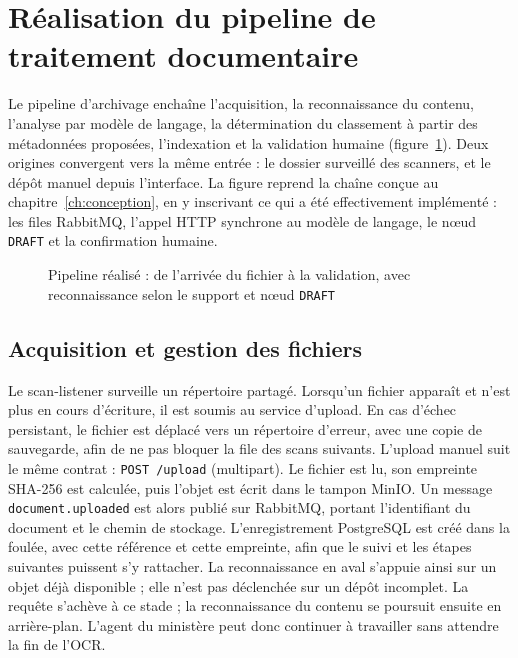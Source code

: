 \section{Réalisation du pipeline de traitement documentaire}

Le pipeline d'archivage enchaîne l'acquisition, la reconnaissance du contenu, l'analyse par modèle de langage, la détermination du classement à partir des métadonnées proposées, l'indexation et la validation humaine (figure~\ref{fig:flux-traitement}). Deux origines convergent vers la même entrée : le dossier surveillé des scanners, et le dépôt manuel depuis l'interface. La figure reprend la chaîne conçue au chapitre~\ref{ch:conception}, en y inscrivant ce qui a été effectivement implémenté : les files RabbitMQ, l'appel HTTP synchrone au modèle de langage, le nœud \texttt{DRAFT} et la confirmation humaine.

\begin{figure}[H]
\centering

\caption{Pipeline réalisé : de l'arrivée du fichier à la validation, avec reconnaissance selon le support et nœud \texttt{DRAFT}}
\label{fig:flux-traitement}
\end{figure}

\subsection{Acquisition et gestion des fichiers}

Le scan-listener surveille un répertoire partagé. Lorsqu'un fichier apparaît et n'est plus en cours d'écriture, il est soumis au service d'upload. En cas d'échec persistant, le fichier est déplacé vers un répertoire d'erreur, avec une copie de sauvegarde, afin de ne pas bloquer la file des scans suivants. L'upload manuel suit le même contrat : \texttt{POST /upload} (multipart). Le fichier est lu, son empreinte SHA-256 est calculée, puis l'objet est écrit dans le tampon MinIO. Un message \texttt{document.uploaded} est alors publié sur RabbitMQ, portant l'identifiant du document et le chemin de stockage. L'enregistrement PostgreSQL est créé dans la foulée, avec cette référence et cette empreinte, afin que le suivi et les étapes suivantes puissent s'y rattacher. La reconnaissance en aval s'appuie ainsi sur un objet déjà disponible ; elle n'est pas déclenchée sur un dépôt incomplet. La requête s'achève à ce stade ; la reconnaissance du contenu se poursuit ensuite en arrière-plan. L'agent du ministère peut donc continuer à travailler sans attendre la fin de l'OCR.

